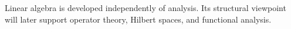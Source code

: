 \begin{remark}
Linear algebra is developed independently of analysis.
Its structural viewpoint will later support operator theory,
Hilbert spaces, and functional analysis.
\end{remark}





% 
% 
% 
% 
% 


% 
% 
% 


% 
% 
% 


% 
% 
% 


